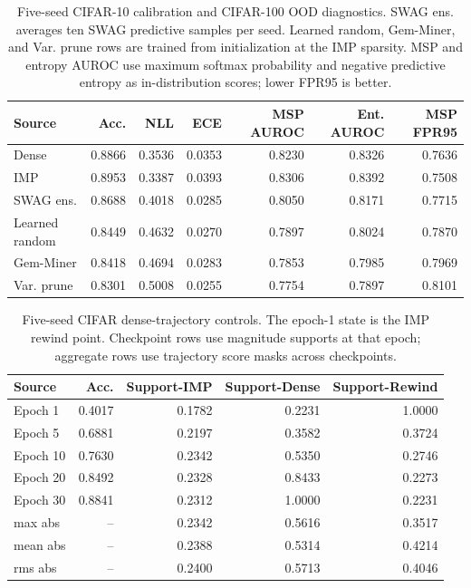 \begin{table}[t]
\centering
\small
\setlength{\tabcolsep}{4pt}
\begin{tabular}{lrrrrrr}
\toprule
Source & Acc. & NLL & ECE & MSP AUROC & Ent. AUROC & MSP FPR95 \\
\midrule
Dense & 0.8866 & 0.3536 & 0.0353 & 0.8230 & 0.8326 & 0.7636 \\
IMP & 0.8953 & 0.3387 & 0.0393 & 0.8306 & 0.8392 & 0.7508 \\
SWAG ens. & 0.8688 & 0.4018 & 0.0285 & 0.8050 & 0.8171 & 0.7715 \\
Learned random & 0.8449 & 0.4632 & 0.0270 & 0.7897 & 0.8024 & 0.7870 \\
Gem-Miner & 0.8418 & 0.4694 & 0.0283 & 0.7853 & 0.7985 & 0.7969 \\
Var. prune & 0.8301 & 0.5008 & 0.0255 & 0.7754 & 0.7897 & 0.8101 \\
\bottomrule
\end{tabular}
\caption{Five-seed CIFAR-10 calibration and CIFAR-100 OOD
diagnostics. SWAG ens. averages ten SWAG predictive samples per
seed. Learned random, Gem-Miner, and Var. prune rows are trained
from initialization at the IMP sparsity. MSP and entropy AUROC use
maximum softmax probability and negative predictive entropy as
in-distribution scores; lower FPR95 is better.}
\label{tab:cifar-calibration-ood-stats}
\end{table}

\begin{table}[t]
\centering
\small
\setlength{\tabcolsep}{4pt}
\begin{tabular}{lrrrr}
\toprule
Source & Acc. & Support-IMP & Support-Dense & Support-Rewind \\
\midrule
Epoch 1 & 0.4017 & 0.1782 & 0.2231 & 1.0000 \\
Epoch 5 & 0.6881 & 0.2197 & 0.3582 & 0.3724 \\
Epoch 10 & 0.7630 & 0.2342 & 0.5350 & 0.2746 \\
Epoch 20 & 0.8492 & 0.2328 & 0.8433 & 0.2273 \\
Epoch 30 & 0.8841 & 0.2312 & 1.0000 & 0.2231 \\
max abs & -- & 0.2342 & 0.5616 & 0.3517 \\
mean abs & -- & 0.2388 & 0.5314 & 0.4214 \\
rms abs & -- & 0.2400 & 0.5713 & 0.4046 \\
\bottomrule
\end{tabular}
\caption{Five-seed CIFAR dense-trajectory controls. The epoch-1 state is the IMP rewind point. Checkpoint rows use magnitude supports at that epoch; aggregate rows use trajectory score masks across checkpoints.}
\label{tab:cifar-trajectory-stats}
\end{table}


